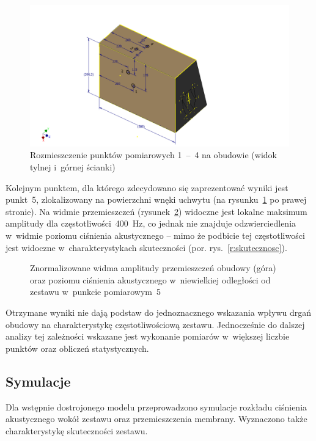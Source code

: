 \documentclass[12pt]{oska}
\newcommand{\range}[2]{\num{#1}~--~\num{#2}}
\begin{document}
		\begin{figure}[!ht]
			\centering
			\includegraphics[width=.8\textwidth,trim={5cm .3cm 5cm 2.7cm},clip]{wibrometr.pdf}
			\caption{Rozmieszczenie punktów pomiarowych \range{1}{4} na obudowie (widok tylnej i~górnej ścianki)}
			\label{r:wibro_pkt}
		\end{figure}
		
		Kolejnym punktem, dla którego zdecydowano się zaprezentować wyniki jest punkt~\num{5}, zlokalizowany na powierzchni wnęki uchwytu (na rysunku~\ref{r:wibro_pkt} po prawej stronie). Na widmie przemieszczeń (rysunek~\ref{r:wibrometr_5}) widoczne jest lokalne maksimum amplitudy dla częstotliwości~\SI{400}{\hertz}, co jednak nie znajduje odzwierciedlenia w~widmie poziomu ciśnienia akustycznego -- mimo że podbicie tej częstotliwości jest widoczne w~charakterystykach skuteczności (por. rys.~\ref{r:skutecznosc}).%
		
		\begin{figure}[H]
			\centering
			\caption{Znormalizowane widma amplitudy przemieszczeń obudowy (góra) oraz poziomu ciśnienia akustycznego w~niewielkiej odległości od zestawu w~punkcie pomiarowym~\num{5}}
			\label{r:wibrometr_5}
		\end{figure}
		
		Otrzymane wyniki nie dają podstaw do jednoznacznego wskazania wpływu drgań obudowy na charakterystykę częstotliwościową zestawu. Jednocześnie do dalszej analizy tej zależności wskazane jest wykonanie pomiarów w~większej liczbie punktów oraz obliczeń statystycznych.
		
	\subsection{Symulacje}
		
		Dla wstępnie dostrojonego modelu przeprowadzono symulacje rozkładu ciśnienia akustycznego wokół zestawu oraz przemieszczenia membrany. Wyznaczono także charakterystykę skuteczności zestawu. 
		
\end{document}
